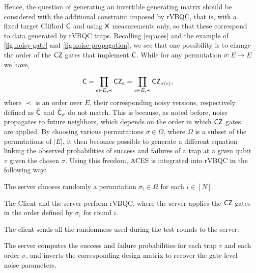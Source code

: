 Hence, the question of generating an invertible generating matrix should be considered with the additional constraint imposed by rVBQC, that is, with a fixed target Clifford \(\mathsf{C}\) and using \(\mathsf{X}\) measurements only, so that these correspond to data generated by rVBQC traps.  Recalling \cref{eq:aces} and the example of \cref{fig:noisy-gate} and \cref{fig:noise-propagation}, we see that one possibility is to change the order of the \(\mathsf{CZ}\) gates that implement \(\mathsf{C}\). While for any permutation \(\sigma: E \rightarrow E\) we have,

\begin{equation}
\mathsf{C} = \prod_{e \in E, \prec} \mathsf{CZ}_e = \prod_{e \in E, \prec} \mathsf{CZ}_{\sigma(e)}, 
\end{equation}
where \(\prec\) is an order over \(E\), their corresponding noisy versions, respectively defined as \(\tilde{\mathsf{C}}\) and \(\tilde{\mathsf{C}}_{\sigma}\) do not match. This is because, as noted before, noise propagates to future neighbors, which depends on the order in which \(\mathsf{CZ}\) gates are applied. By choosing various permutations \(\sigma \in \Omega\), where \(\Omega\) is a subset of the permutations of \(|E|\), it then becomes possible to generate a different equation linking the observed probabilities of success and failures of a trap at a given qubit \(v\) given the chosen \(\sigma\). Using this freedom, ACES is integrated into rVBQC in the following way:
\begin{protocol}
  \label{proto:vbqc-aces}
\item
  \begin{algorithmic}[0]
    \State The server chooses randomly a permutation \(\sigma_i \in \Omega\) for each \(i \in [N]\).
    \EndProcedure
    
    \State The Client and the server perform rVBQC, where the server applies the \(\mathsf{CZ}\) gates in the order defined by \(\sigma_i\) for round \(i\).
    \EndProcedure
    
    \State The client sends all the randomness used during the test rounds to the server.
    \EndProcedure
    
    \State The server computes the success and failure probabilities for each trap \(v\) and each order \(\sigma\), and inverts the corresponding design matrix to recover the gate-level noise parameters.
    \EndProcedure
  \end{algorithmic}
\end{protocol}

